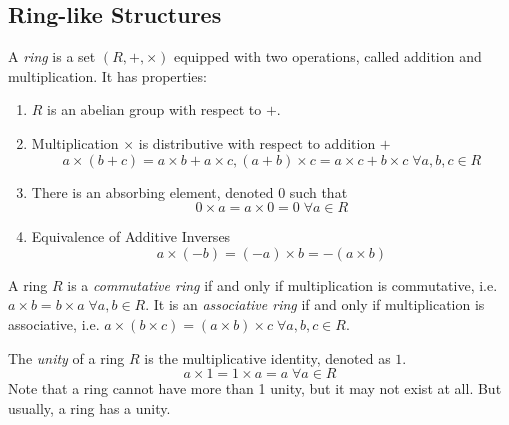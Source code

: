 \documentclass{article}
\begin{document}
  \subsection{Ring-like Structures}

    \begin{definition}
      A \textit{ring} is a set $(R, +, \times)$ equipped with two operations, called addition and multiplication. It has properties: 
      \begin{enumerate}
        \item $R$ is an abelian group with respect to $+$.
        \item Multiplication $\times$ is distributive with respect to addition $+$
          \begin{equation}
            a \times (b + c) = a\times b + a\times c, (a+b)\times c = a\times c + b\times c \; \forall a, b, c \in R
          \end{equation}
        \item There is an absorbing element, denoted $0$ such that 
          \begin{equation}
            0\times a = a\times 0 = 0 \; \forall a \in R
          \end{equation}
        \item Equivalence of Additive Inverses
          \begin{equation}
            a \times (-b) = (-a) \times b = - (a\times b)
          \end{equation}
      \end{enumerate}
    \end{definition}

    \begin{definition}
      A ring $R$ is a \textit{commutative ring} if and only if multiplication is commutative, i.e. $a\times b = b \times a \; \forall a, b \in R$. It is an \textit{associative ring} if and only if multiplication is associative, i.e. $a \times (b \times c) = (a \times b) \times c \; \forall a, b, c \in R$.
    \end{definition}

    \begin{definition}
      The \textit{unity} of a ring $R$ is the multiplicative identity, denoted as $1$. 
      \begin{equation}
        a \times 1 = 1 \times a = a \; \forall a \in R
      \end{equation}
      Note that a ring cannot have more than 1 unity, but it may not exist at all. But usually, a ring has a unity.
    \end{definition}
\end{document}
